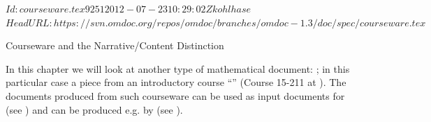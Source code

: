 \svnInfo $Id: courseware.tex 9251 2012-07-23 10:29:02Z kohlhase $
\svnKeyword $HeadURL: https://svn.omdoc.org/repos/omdoc/branches/omdoc-1.3/doc/spec/courseware.tex $

\begin{tchapter}[id=courseware]{Courseware and the Narrative/Content Distinction}

In this chapter we will look at another type of mathematical document:
{}; in this particular case a piece from an introductory
course ``{}''
(Course 15-211 at {}). The {\omdoc} documents
produced from such courseware can be used as input documents for {\activemath}
(see {}) and can be produced e.g. by {\cpoint} (see
{}).


\end{tchapter}
